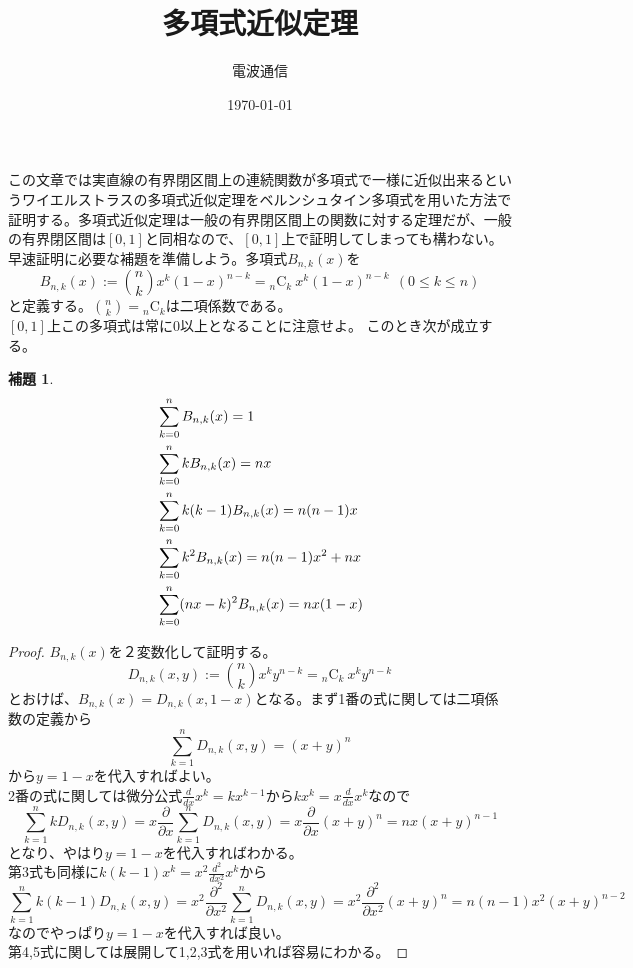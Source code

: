 \documentclass[leqno]{jsarticle}
\title{多項式近似定理}
\author{電波通信}
\date{\today}
\newtheorem{lem}[thm]{補題}
\newcommand{\nik}[2]{{}_{#1}\text{C}_{#2}}
\newcommand{\bb}{B_{n,k}(x)}
\newcommand{\sss}{D_{n,k}(x,y)}
\newcommand{\dd}{\partial}
\begin{document}
\maketitle
この文章では実直線の有界閉区間上の連続関数が多項式で一様に近似出来るというワイエルストラスの多項式近似定理をベルンシュタイン多項式を用いた方法で証明する。多項式近似定理は一般の有界閉区間上の関数に対する定理だが、一般の有界閉区間は$[0,1]$と同相なので、$[0,1]$上で証明してしまっても構わない。\\ 
早速証明に必要な補題を準備しよう。多項式$\bb$を
\[
B_{n,k}(x):=\binom nk x^k(1-x)^{n-k}=\nik{n}{k}\ x^k(1-x)^{n-k}\ \ (0\le k\le n)
\]
と定義する。$\binom nk =\nik{n}{k}$は二項係数である。$[0,1]上この多項式は常に0以上となることに注意せよ。$
このとき次が成立する。

\begin{lem}${}$
\begin{eqnarray}
\displaystyle &\sum_{k=0}^{n}\bb=1\\ 
\displaystyle &\sum_{k=0}^{n}k\bb=nx\\ 
\displaystyle &\sum_{k=0}^{n}k(k-1)\bb=n(n-1)x\\ 
\displaystyle &\sum_{k=0}^{n}k^2\bb=n(n-1)x^2+nx\\ 
\displaystyle &\sum_{k=0}^{n}(nx-k)^2\bb=nx(1-x)
\end{eqnarray}
\end{lem}
\begin{proof}
$\bb$を２変数化して証明する。
\[
\sss := \binom nk x^ky^{n-k}=\nik{n}{k}\ x^ky^{n-k}
\]とおけば、$\bb=D_{n,k}(x,1-x)$となる。まず1番の式に関しては二項係数の定義から
\[
\sum_{k=1}^{n}\sss=(x+y)^n
\]から$y=1-x$を代入すればよい。\\ 
2番の式に関しては微分公式$\frac{d}{dx}x^k=kx^{k-1}$から$kx^k=x\frac{d}{dx}x^k$なので
\[
\sum_{k=1}^{n}k\sss=x\frac{\dd}{\dd x}\sum_{k=1}^{n}\sss=x\frac{\dd}{\dd x}(x+y)^n=nx(x+y)^{n-1}
\]となり、やはり$y=1-x$を代入すればわかる。\\ 
第3式も同様に$k(k-1)x^{k}=x^2\frac{d^2}{dx^2}x^k$から
\[
\sum_{k=1}^{n}k(k-1)\sss=x^2\frac{\dd^2}{\dd x^2}\sum_{k=1}^{n}\sss=x^2\frac{\dd^2}{\dd x^2}(x+y)^n=n(n-1)x^2(x+y)^{n-2}
\]なのでやっぱり$y=1-x$を代入すれば良い。\\ 
第4,5式に関しては展開して1,2,3式を用いれば容易にわかる。
\end{proof}
\end{document}
